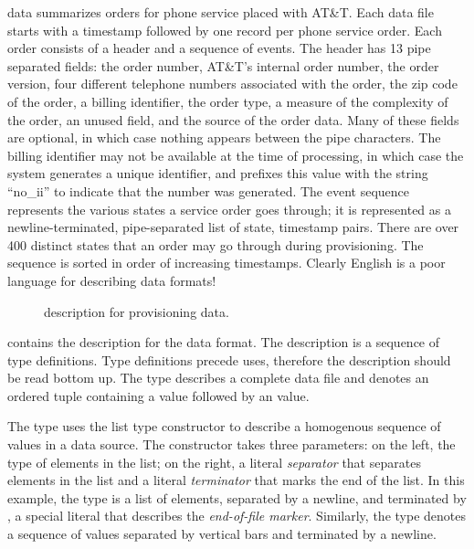 \documentclass{sigplanconf}
\begin{document}
\dibbler{} data summarizes orders for phone service placed with AT\&T.
Each \dibbler{} data file starts with a timestamp followed by one
record per phone service order.  Each order consists of a header and a
sequence of events.  The header has 13 pipe separated fields: the
order number, AT\&T's internal order number, the order version, four
different telephone numbers associated with the order, the zip code of
the order, a billing identifier, the order type, a measure of the
complexity of the order, an unused field, and the source of the order
data.  Many of these fields are optional, in which case nothing
appears between the pipe characters.  The billing identifier may not
be available at the time of processing, in which case the system
generates a unique identifier, and prefixes this value with the string
``no\_ii'' to indicate that the number was generated. The event
sequence represents the various states a service order goes through;
it is represented as a newline-terminated, pipe-separated list of
state, timestamp pairs.  There are over 400 distinct states that an
order may go through during provisioning.  The sequence is sorted in
order of increasing timestamps.  Clearly
English is a poor language for describing data formats!

\begin{figure}

  \caption{\padsml{} description for \dibbler{} provisioning data.}
  \label{figure:sirius_pml}
\end{figure}

 contains the \padsml{} description for the
\dibbler{} data format.  The description is a sequence of type
definitions.  Type definitions precede uses, therefore the description
should be read bottom up.
The type  describes a complete \dibbler{} data
file and denotes an ordered tuple containing a
 value followed by an  value.

The type  uses the list type constructor
 to describe a homogenous sequence of values in a data
source.  The  constructor takes three parameters: on the
left, the type of elements in the list; on the right, a literal
\emph{separator} that separates elements in the list and a literal
\emph{terminator} that marks the end of the list.  
In this example, the type  is a list of
 elements, separated by a newline, and terminated by
, a special literal that describes the \emph{end-of-file
  marker}.  Similarly, the  type denotes a
sequence of  values separated by vertical bars and
terminated by a newline.
\end{document}
